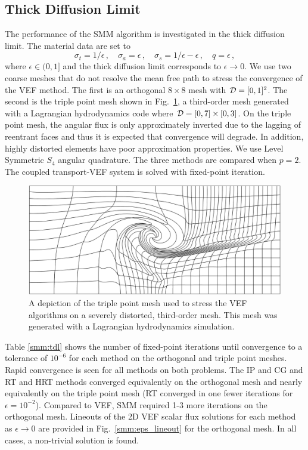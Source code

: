 \documentclass[../doc.tex]{subfiles}
\begin{document}
\subsection{Thick Diffusion Limit}
The performance of the SMM algorithm is investigated in the thick diffusion limit. The material data are set to 
	\begin{equation}
		\sigma_t = 1/\epsilon \,, \quad \sigma_a = \epsilon \,, \quad \sigma_s = 1/\epsilon - \epsilon\,, \quad q = \epsilon \,,
	\end{equation}
where $\epsilon \in (0,1]$ and the thick diffusion limit corresponds to $\epsilon \rightarrow 0$. We use two coarse meshes that do not resolve the mean free path to stress the convergence of the VEF method. The first is an orthogonal $8\times 8$ mesh with $\mathcal{D} = [0,1]^2$. The second is the triple point mesh shown in Fig.~\ref{smm:triple_point_mesh}, a third-order mesh generated with a Lagrangian hydrodynamics code where $\mathcal{D} = [0,7]\times [0,3]$. On the triple point mesh, the angular flux is only approximately inverted due to the lagging of reentrant faces and thus it is expected that convergence will degrade. In addition, highly distorted elements have poor approximation properties. We use Level Symmetric $S_4$ angular quadrature. The three methods are compared when $p=2$. The coupled transport-VEF system is solved with fixed-point iteration. 
\begin{figure}
\centering
\includegraphics[width=.65\textwidth]{data/img/3point.png}
\caption{A depiction of the triple point mesh used to stress the VEF algorithms on a severely distorted, third-order mesh. This mesh was generated with a Lagrangian hydrodynamics simulation. }
\label{smm:triple_point_mesh}
\end{figure}

Table \ref{smm:tdl} shows the number of fixed-point iterations until convergence to a tolerance of $10^{-6}$ for each method on the orthogonal and triple point meshes. Rapid convergence is seen for all methods on both problems. 
The IP and CG and RT and HRT methods converged equivalently on the orthogonal mesh and nearly equivalently on the triple point mesh (RT converged in one fewer iterations for $\epsilon = 10^{-2}$). Compared to VEF, SMM required 1-3 more iterations on the orthogonal mesh. 
Lineouts of the 2D VEF scalar flux solutions for each method as $\epsilon \rightarrow 0$ are provided in Fig.~\ref{smm:eps_lineout} for the orthogonal mesh. In all cases, a non-trivial solution is found. 
\end{document}
